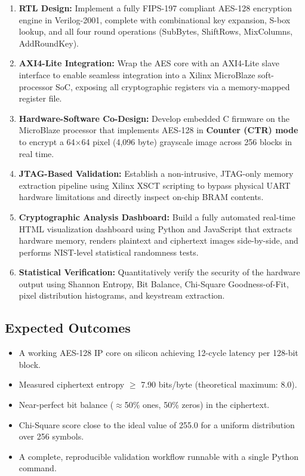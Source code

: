 \documentclass[12pt,a4paper]{article}
\begin{document}
\begin{enumerate}[leftmargin=*]
    \item \textbf{RTL Design:} Implement a fully FIPS-197 compliant AES-128 encryption engine in Verilog-2001, complete with combinational key expansion, S-box lookup, and all four round operations (SubBytes, ShiftRows, MixColumns, AddRoundKey).
    
    \item \textbf{AXI4-Lite Integration:} Wrap the AES core with an AXI4-Lite slave interface to enable seamless integration into a Xilinx MicroBlaze soft-processor SoC, exposing all cryptographic registers via a memory-mapped register file.
    
    \item \textbf{Hardware-Software Co-Design:} Develop embedded C firmware on the MicroBlaze processor that implements AES-128 in \textbf{Counter (CTR) mode} to encrypt a 64$\times$64 pixel (4,096 byte) grayscale image across 256 blocks in real time.
    
    \item \textbf{JTAG-Based Validation:} Establish a non-intrusive, JTAG-only memory extraction pipeline using Xilinx XSCT scripting to bypass physical UART hardware limitations and directly inspect on-chip BRAM contents.
    
    \item \textbf{Cryptographic Analysis Dashboard:} Build a fully automated real-time HTML visualization dashboard using Python and JavaScript that extracts hardware memory, renders plaintext and ciphertext images side-by-side, and performs NIST-level statistical randomness tests.
    
    \item \textbf{Statistical Verification:} Quantitatively verify the security of the hardware output using Shannon Entropy, Bit Balance, Chi-Square Goodness-of-Fit, pixel distribution histograms, and keystream extraction.
\end{enumerate}

\subsection{Expected Outcomes}

\begin{itemize}[leftmargin=*]
    \item A working AES-128 IP core on silicon achieving 12-cycle latency per 128-bit block.
    \item Measured ciphertext entropy $\geq$ 7.90 bits/byte (theoretical maximum: 8.0).
    \item Near-perfect bit balance ($\approx$50\% ones, 50\% zeros) in the ciphertext.
    \item Chi-Square score close to the ideal value of 255.0 for a uniform distribution over 256 symbols.
    \item A complete, reproducible validation workflow runnable with a single Python command.
\end{itemize}
\end{document}
